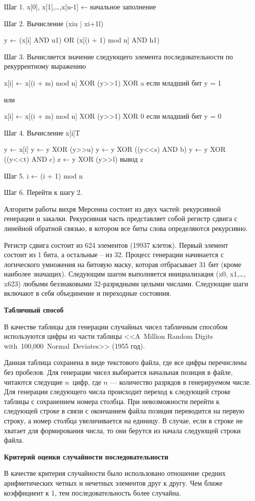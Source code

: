  Шаг 1. x[0], x[1],…,x[n-1] ←  начальное    заполнение

 Шаг 2. Вычисление (xiu | xi+1l)
 
  y ← (x[i] AND u1) OR (x[(i + 1) mod n] AND h1)

 Шаг 3. Вычисляется значение следующего элемента последовательности по 
 рекуррентному выражению
 
  x[i] ← x[(i + m) mod n] XOR (y>>1) XOR a    если младший бит y = 1

  или
  
  x[i] ← x[(i + m) mod n] XOR (y>>1) XOR 0   если  младший бит y = 0

 Шаг 4. Вычисление x[i]T
 
  y ← x[i]
  y ← y XOR (y>>u)
  y ← y XOR ((y<<s) AND b)
  y ← y XOR ((y<<t) AND c)
  z ← y XOR (y>>l)
  вывод z
  
 Шаг 5. i ← (i + 1) mod n 

 Шаг 6. Перейти к шагу 2.

Алгоритм работы вихря Мерсенна состоит из двух частей: рекурсивной генерации и закалки. Рекурсивная часть представляет собой регистр сдвига с линейной обратной связью, в котором все биты слова определяются рекурсивно.

Регистр сдвига состоит из 624 элементов (19937 клеток). Первый элемент состоит из 1 бита, а остальные -- из 32. Процесс генерации начинается с логического умножения на битовую маску, которая отбрасывает 31 бит (кроме наиболее значащих). Следующим шагом выполняется инициализация (x0, x1,…, x623) любыми беззнаковыми 32-разрядными целыми числами. Следующие шаги включают в себя объединение и переходные состояния.

\textbf{Табличный способ}

В качестве таблицы для генерации случайных чисел табличным способом используются
цифры из части таблицы <<A~Million Random Digits with~100,000~Normal~Deviates>> (1955 год).

Данная таблица сохранена в виде текстового файла, где все цифры перечислены без пробелов. Для генерации чисел выбирается
начальная позиция в файле, читаются следущие $n$~цифр, где $n$ --- количество
разрядов в генерируемом числе. Для генерации следующего числа происходит переход к следующей строке
таблицы с сохранением номера столбца. При невозможности перейти к следующей строке в связи с окончанием файла позиция переводится на первую строку, а номер столбца увеличивается на единицу. 
В случае, если в строке не хватает для формирования числа, то они берутся из начала следующей строки файла.

\textbf{Критерий оценки случайности последовательности}

В качестве критерия случайности было использовано отношение средних
арифметических четных и нечетных элементов друг к другу. Чем ближе
коэффициент к 1, тем последовательность более случайна. 
